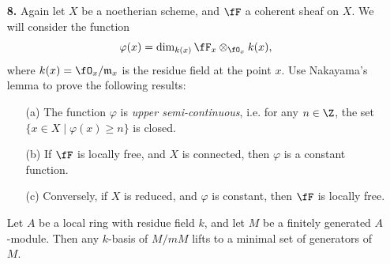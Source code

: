 \documentclass[a4paper]{article}
\begin{document}
\begin{enumerate} [label=\textbf{\arabic*.}, leftmargin=0em]
\begin{proof}
\begin{itemize}[leftmargin=0em]
        \item[(c)] By the previous parts and lemma 2, we reduce to the following algebraic problem: let $A$ be a noetherian local ring with maximal ideal $\goth{m}$, and let $M$ be a finitely generated $A$-module. Then $M \cong A$ if and only if there exists a finitely generated $A$-module $N$ such that $M \otimes_A N \cong A$. One direction is clear. Conversely, suppose $M, N$ are finitely generated $A$-modules such that $M \otimes_A N \cong A$. Let $k = A / \goth{m}$ be the residue field of $A$. Tensoring with $k$ gives
        \begin{equation*}
            (M \otimes_A k) \otimes_k (N \otimes_A k) \cong (M \otimes_A N) \otimes_A k \cong A \otimes_A k \cong k,
        \end{equation*}
        which implies $M \otimes_A k \cong k$. By Nakayama's lemma, $M$ is generated by a single element, which implies $M \cong A / \goth{a}$ for some ideal $\goth{a}$ of $A$, and similarly $N = A / \goth{b}$. We have $$A \cong M \otimes_A N \cong A / \goth{a} \otimes_A A / \goth{b} \cong A / (\goth{a} + \goth{b}),$$
        which implies $\goth{a} + \goth{b} = (0)$. Hence, $M, N \cong A$.
    \end{itemize}
\end{proof}

\item[\textbf{8.}] Again let $X$ be a noetherian scheme, and $\fF$ a coherent sheaf on $X$. We will consider the function
\begin{equation*}
    \varphi(x) = \dim_{k(x)}\fF_x \otimes_{\fO_x} k(x),
\end{equation*}
where $k(x) = \fO_x / \goth{m}_x$ is the residue field at the point $x$. Use Nakayama's lemma to prove the following results:
\begin{itemize}
    \item[(a)] The function $\varphi$ is \textit{upper semi-continuous}, i.e. for any $n \in \Z$, the set $\{ x \in X \mid \varphi(x) \geq n\}$ is closed.
    \item[(b)] If $\fF$ is locally free, and $X$ is connected, then $\varphi$ is a constant function.
    \item[(c)] Conversely, if $X$ is reduced, and $\varphi$ is constant, then $\fF$ is locally free.
\end{itemize}

\begin{lemma} [Nakayama]
    Let $A$ be a local ring with residue field $k$, and let $M$ be a finitely generated $A$-module. Then any $k$-basis of $M / m M$ lifts to a minimal set of generators of $M$.
\end{lemma}


\end{enumerate}
\end{document}
